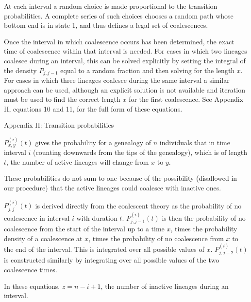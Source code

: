 \documentclass[12pt]{article}
\begin{document}
\medskip

At each interval a random choice is made proportional to the transition
probabilities.  A complete series of such choices chooses a random path
whose bottom end is in state 1, and thus defines a legal set of
coalescences.

Once the interval in which coalescence occurs has been determined, the
exact time of coalescence within that interval is needed.  For cases in
which two lineages coalesce during an interval, this can be solved
explicitly by setting the integral of the density $P_{j,j-1}$ equal to a
random fraction and then solving for the length $x$.  For cases in which
three lineages coalesce during the same interval a similar approach can
be used, although an explicit solution is not available and iteration
must be used to find the correct length $x$ for the first
coalescence.  See Appendix II, equations 10 and 11, for the full form of these equations.


\bigskip

Appendix II:  Transition probabilities

\bigskip

$P_{x,y}^{(i)}(t)$ gives the probability for a genealogy of $n$ individuals 
that in time interval $i$
(counting downwards from the tips of the genealogy), which is of length $t$,
the number of active lineages will change from $x$ to $y$.

These probabilities do not sum to one because of the possibility
(disallowed in our procedure) that the active lineages could coalesce
with inactive ones.

$P_{j,j}^{(i)}(t)$ is derived directly from the coalescent theory as the 
probability of no coalescence in interval $i$ with duration $t$.
$P_{j,j-1}^{(i)}(t)$ is then the probability of no coalescence from the
start of the interval up to a time $x$, times the probability density 
of a coalescence at $x$, times the probability of no coalescence 
from $x$ to
the end of the interval.  This is integrated over all possible values of
$x$.  $P_{j,j-2}^{(i)}(t)$ is constructed similarly by integrating over 
all possible values of the two coalescence times.

In these equations, $z=n-i+1$, the number of inactive lineages during an
interval.
\end{document}
